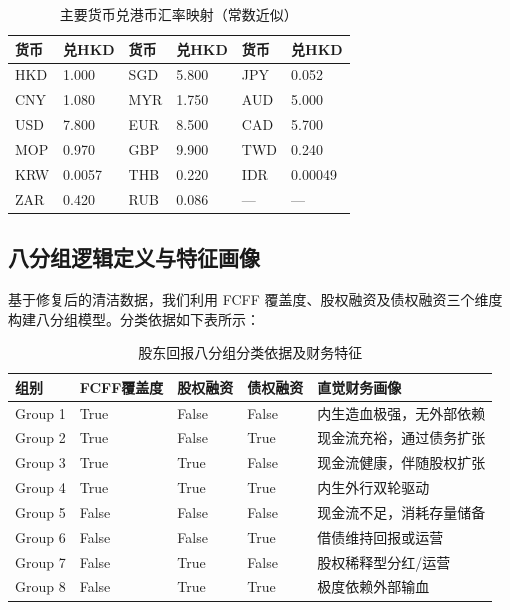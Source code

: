 \documentclass[a4paper,10pt]{article}
\begin{document}
\begin{table}[H]
\centering
\caption{主要货币兑港币汇率映射（常数近似）}
\label{tab:fx_mapping}
\small
\begin{tabular}{llllll}
\toprule
货币 & 兑HKD & 货币 & 兑HKD & 货币 & 兑HKD \\
\midrule
HKD & 1.000 & SGD & 5.800 & JPY & 0.052 \\
CNY & 1.080 & MYR & 1.750 & AUD & 5.000 \\
USD & 7.800 & EUR & 8.500 & CAD & 5.700 \\
MOP & 0.970 & GBP & 9.900 & TWD & 0.240 \\
KRW & 0.0057 & THB & 0.220 & IDR & 0.00049 \\
ZAR & 0.420 & RUB & 0.086 & — & — \\
\bottomrule
\end{tabular}
\end{table}

\subsection{八分组逻辑定义与特征画像}

基于修复后的清洁数据，我们利用 FCFF 覆盖度、股权融资及债权融资三个维度构建八分组模型。分类依据如下表所示：

\begin{table}[H]
\centering
\caption{股东回报八分组分类依据及财务特征}
\label{tab:eight_groups}
\small
\begin{tabular}{lp{1.8cm}p{1.8cm}p{1.8cm}p{4.5cm}}
\toprule
组别 & FCFF覆盖度 & 股权融资 & 债权融资 & 直觉财务画像 \\
\midrule
Group 1 & True  & False & False & 内生造血极强，无外部依赖 \\
Group 2 & True  & False & True  & 现金流充裕，通过债务扩张 \\
Group 3 & True  & True  & False & 现金流健康，伴随股权扩张 \\
Group 4 & True  & True  & True  & 内生外行双轮驱动 \\
Group 5 & False & False & False & 现金流不足，消耗存量储备 \\
Group 6 & False & False & True  & 借债维持回报或运营 \\
Group 7 & False & True  & False & 股权稀释型分红/运营 \\
Group 8 & False & True  & True  & 极度依赖外部输血 \\
\bottomrule
\end{tabular}
\end{table}
\end{document}

